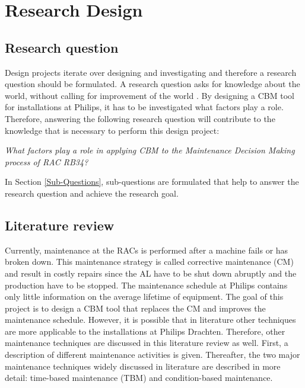 
\chapter{Research Design} %

\label{Chapter3} %

\section{Research question}
Design projects iterate over designing and investigating and therefore a research question should be formulated. A research question asks for knowledge about the world, without calling for improvement of the world \parencite{Wieringa2014}. By designing a CBM tool for installations at Philips, it has to be investigated what factors play a role. Therefore, answering the following research question will contribute to the knowledge that is necessary to perform this design project:
\begin{center}
\textit{What factors play a role in applying CBM to the Maintenance Decision Making process of RAC RB34?}\\
\end{center}
In Section \ref{Sub-Questions}, sub-questions are formulated that help to answer the research question and achieve the research goal.

\section{Literature review} \label{Literature review}
Currently, maintenance at the RACs is performed after a machine fails or has broken down. This maintenance strategy is called corrective maintenance (CM) and result in costly repairs since the AL have to be shut down abruptly and the production have to be stopped. The maintenance schedule at Philips contains only little information on the average lifetime of equipment. The goal of this project is to design a CBM tool that replaces the CM and improves the maintenance schedule. However, it is possible that in literature other techniques are more applicable to the installations at Philips Drachten. Therefore, other maintenance techniques are discussed in this literature review as well. First, a description of different maintenance activities is given. Thereafter, the two major maintenance techniques widely discussed in literature are described in more detail: time-based maintenance (TBM) and condition-based maintenance.

